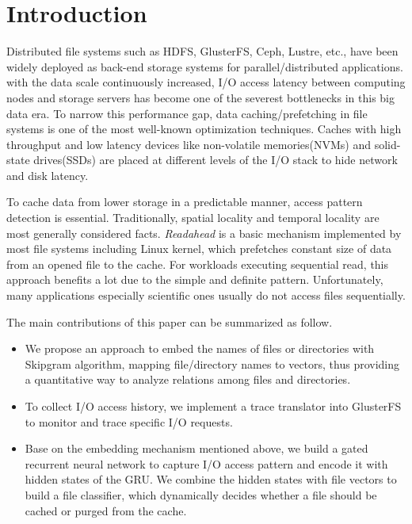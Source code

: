 \documentclass[conference]{IEEEtran}
\begin{document}
\section{Introduction}
Distributed file systems such as HDFS\cite{HDFS}, GlusterFS\cite{GlusterFS}, Ceph\cite{Ceph}, Lustre\cite{Lustre}, etc., have been widely deployed as back-end storage systems for parallel/distributed applications.
with the data scale continuously increased, I/O access latency between computing nodes and storage servers has become one of the severest bottlenecks in this big data era.
To narrow this performance gap, data caching/prefetching in file systems is one of the most well-known optimization techniques.
Caches with high throughput and low latency devices like non-volatile memories(NVMs) and solid-state drives(SSDs) are placed at different levels of the I/O stack to hide network and disk latency.

To cache data from lower storage in a predictable manner, access pattern detection is essential.
Traditionally, spatial locality and temporal locality are most generally considered facts. 
\textit{Readahead} is a basic mechanism implemented by most file systems\cite{WhyDoes} including Linux kernel, which prefetches constant size of data from an opened file to the cache. 
For workloads executing sequential read, this approach benefits a lot due to the simple and definite pattern.
Unfortunately, many applications especially scientific ones usually do not access files sequentially.

The main contributions of this paper can be summarized as follow.
\begin{itemize}
    \item We propose an approach to embed the names of files or directories with Skipgram algorithm,
    mapping file/directory names to vectors, thus providing a quantitative way to analyze relations among files and directories.
    \item To collect I/O access history, we implement a trace translator into GlusterFS to monitor and trace specific I/O requests.
    \item Base on the embedding mechanism mentioned above, we build a gated recurrent neural network to capture I/O access pattern and encode it with hidden states of the GRU.
    We combine the hidden states with file vectors to build a file classifier, which dynamically decides whether a file should be cached or purged from the cache.

\end{itemize}
\end{document}
